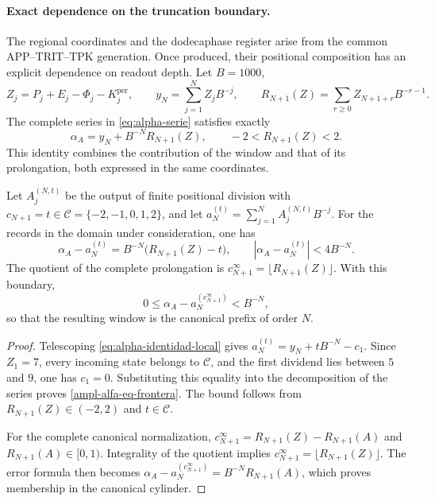 \paragraph{Exact dependence on the truncation boundary.}
\label{ampl-alfa-frontera-exacta}
The regional coordinates and the dodecaphase register arise from the
common APP--TRIT--TPK generation. Once produced, their positional
composition has an explicit dependence on readout depth. Let $B=1000$,
\[
 Z_j=P_j+E_j-\Phi_j-K_j^{\mathrm{per}},\qquad
 y_N=\sum_{j=1}^{N}Z_jB^{-j},\qquad
 R_{N+1}(Z)=\sum_{r\geq0}Z_{N+1+r}B^{-r-1}.
\]
The complete series in \eqref{eq:alpha-serie} satisfies exactly
\[
 \alpha_A=y_N+B^{-N}R_{N+1}(Z),\qquad
 -2<R_{N+1}(Z)<2.
\]
This identity combines the contribution of the window and that of its
prolongation, both expressed in the same coordinates.

\begin{proposition}
\label{ampl-alfa-prop-frontera}
Let $A_j^{(N,t)}$ be the output of finite positional division with
$c_{N+1}=t\in\mathcal C=\{-2,-1,0,1,2\}$, and let
$a_N^{(t)}=\sum_{j=1}^{N}A_j^{(N,t)}B^{-j}$. For the records in the
domain under consideration, one has
\begin{equation}
 \alpha_A-a_N^{(t)}
 =B^{-N}\bigl(R_{N+1}(Z)-t\bigr),
 \qquad
 |\alpha_A-a_N^{(t)}|<4B^{-N}.
 \label{ampl-alfa-eq-frontera}
\end{equation}
The quotient of the complete prolongation is
$c_{N+1}^{\infty}=\lfloor R_{N+1}(Z)\rfloor$. With this boundary,
\[
 0\leq\alpha_A-a_N^{(c_{N+1}^{\infty})}<B^{-N},
\]
so that the resulting window is the canonical prefix of order $N$.
\end{proposition}
\begin{proof}
Telescoping \eqref{eq:alpha-identidad-local} gives
$a_N^{(t)}=y_N+tB^{-N}-c_1$. Since $Z_1=7$, every incoming state
belongs to $\mathcal C$, and the first dividend lies between $5$ and $9$,
one has $c_1=0$. Substituting this equality into the decomposition of the
series proves \eqref{ampl-alfa-eq-frontera}. The bound follows from
$R_{N+1}(Z)\in(-2,2)$ and $t\in\mathcal C$.

For the complete canonical normalization,
$c_{N+1}^{\infty}=R_{N+1}(Z)-R_{N+1}(A)$ and
$R_{N+1}(A)\in[0,1)$. Integrality of the quotient implies
$c_{N+1}^{\infty}=\lfloor R_{N+1}(Z)\rfloor$. The error formula
then becomes
$\alpha_A-a_N^{(c_{N+1}^{\infty})}=B^{-N}R_{N+1}(A)$, which proves
membership in the canonical cylinder.
\end{proof}

